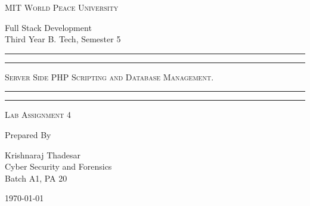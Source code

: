 \documentclass[11pt]{article}
\begin{document}
\begin{titlepage}
    \centering


    \huge\textsc{
        MIT World Peace University
    }\\

    \vspace{0.75\baselineskip} %

    \LARGE{
        Full Stack Development\\
        Third Year B. Tech, Semester 5
    }

    \vfill %


    \rule{\textwidth}{1.6pt}\vspace*{-\baselineskip}\vspace*{2pt}
    \rule{\textwidth}{0.6pt}
    \vspace{0.75\baselineskip} %



    \huge{\textsc{
            Server Side PHP Scripting and Database Management.
        }} \\



    \vspace{0.5\baselineskip} %
    \rule{\textwidth}{0.6pt}\vspace*{-\baselineskip}\vspace*{2.8pt}
    \rule{\textwidth}{1.6pt}

    \vspace{1\baselineskip} %


    \LARGE\textsc{
        Lab Assignment 4
    } %
    \vfill


    Prepared By
    \vspace{0.5\baselineskip} %

    \Large{
        Krishnaraj Thadesar \\
        Cyber Security and Forensics\\
        Batch A1, PA 20
    }


    \vspace{0.5\baselineskip} %
    \today

\end{titlepage}
\end{document}
